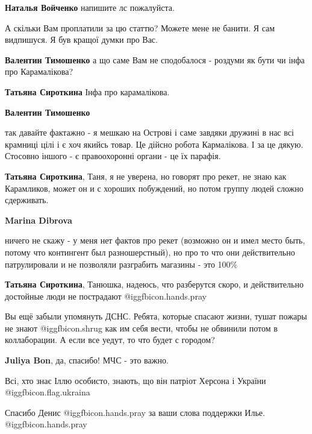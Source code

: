 \begin{itemize}
\begin{itemize}
\textbf{Наталья Войченко} напишите лс пожалуйста.
\end{itemize} %


А скільки Вам проплатили за цю статтю? Можете мене не банити. Я сам видпишуся.
Я був кращої думки про Вас.

\begin{itemize} %
\textbf{Валентин Тимошенко} а що саме Вам не сподобалося - роздуми як бути чи інфа про Карамалікова?

\textbf{Татьяна Сироткина} Інфа про карамалікова.

\textbf{Валентин Тимошенко} 

так давайте фактажно - я мешкаю на Острові і саме завдяки дружині в нас всі
крамниці цілі і є хоч якийсь товар. Це дійсно робота Кармалікова. І за це
дякую. Стосовно іншого - є правоохоронні органи - це їх парафія.

\textbf{Татьяна Сироткина}, Таня, я не уверена, но говорят про рекет, не знаю как Карамликов, может он и с хороших побуждений, но потом группу людей сложно сдерживать.

\textbf{Marina Dibrova} 

ничего не скажу - у меня нет фактов про рекет (возможно он и имел место быть,
потому что контингент был разношерстный), но про то что они действительно
патрулировали и не позволяли разграбить магазины - это 100\%

\textbf{Татьяна Сироткина}, Танюшка, надеюсь, что разберутся скоро, и действительно достойные люди не пострадают  @igg{fbicon.hands.pray} 
\end{itemize} %


Вы ещё забыли упомянуть ДСНС. Ребята, которые спасают жизни, тушат пожары не
знают  @igg{fbicon.shrug}  как им себя вести, чтобы не обвинили потом в коллаборации. А
если все уедут, то что будет с городом?

\textbf{Juliya Bon}, да, спасибо! МЧС - это важно.

Всі, хто знає Іллю особисто, знають, що він патріот Херсона і України @igg{fbicon.flag.ukraina}

Спасибо Денис @igg{fbicon.hands.pray} за ваши слова поддержки Илье. @igg{fbicon.hands.pray} 


\end{itemize}
